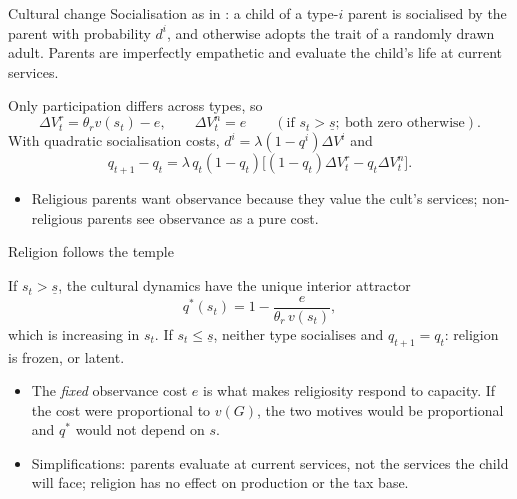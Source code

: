 \documentclass[11pt,aspectratio=169]{beamer}
\begin{document}
\begin{frame}{Cultural change}
Socialisation as in \citet{bisin2001}: a child of a type-$i$ parent is socialised by the parent
with probability $d^i$, and otherwise adopts the trait of a randomly drawn adult. Parents are
imperfectly empathetic and evaluate the child's life at current services.

\medskip
Only participation differs across types, so
\[
\Delta V^r_t=\theta_r v(s_t)-e,\qquad \Delta V^n_t=e
\qquad(\text{if } s_t>\underline s;\ \text{both zero otherwise}).
\]
With quadratic socialisation costs, $d^i=\lambda(1-q^i)\Delta V^i$ and
\[
q_{t+1}-q_t=\lambda\,q_t(1-q_t)\bigl[(1-q_t)\Delta V^r_t-q_t\Delta V^n_t\bigr].
\]
\begin{itemize}
\item Religious parents want observance because they value the cult's services; non-religious
parents see observance as a pure cost.
\end{itemize}
\end{frame}

\begin{frame}{Religion follows the temple}
\begin{lemma}
If $s_t>\underline s$, the cultural dynamics have the unique interior attractor
\[
q^*(s_t)=1-\frac{e}{\theta_r\,v(s_t)},
\]
which is increasing in $s_t$. If $s_t\le\underline s$, neither type socialises and $q_{t+1}=q_t$:
religion is frozen, or latent.
\end{lemma}
\begin{itemize}
\item The \emph{fixed} observance cost $e$ is what makes religiosity respond to capacity. If the
cost were proportional to $v(G)$, the two motives would be proportional and $q^*$ would not
depend on $s$.
\item Simplifications: parents evaluate at current services, not the services the child will face;
religion has no effect on production or the tax base.
\end{itemize}
\end{frame}
\end{document}
